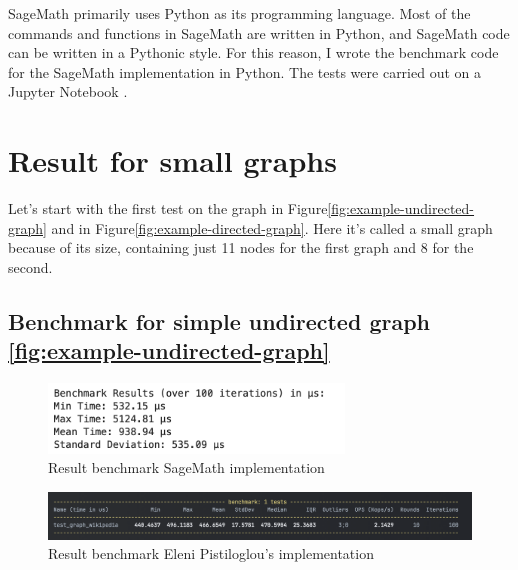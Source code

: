 SageMath primarily uses Python as its programming language.
Most of the commands and functions in SageMath are written in Python, and SageMath code can be written in a Pythonic style.
For this reason, I wrote the benchmark code for the SageMath implementation in Python.
The tests were carried out on a Jupyter Notebook \cite{jupyternotebook}.


\section{Result for small graphs}\label{sec:result-for-small-graphs}

Let's start with the first test on the graph in Figure\ref{fig:example-undirected-graph} and in Figure\ref{fig:example-directed-graph}.
Here it's called a small graph because of its size, containing just 11 nodes for the first graph and 8 for the second.

\newpage

\subsection{Benchmark for simple undirected graph \ref{fig:example-undirected-graph}}\label{subsec:benchmark-for-simple-undirected-graph}

\begin{figure}[!h]
    \centering
    \includegraphics[width=0.70\textwidth]{images/benchmark/graph_wikipedia/benchmark_graph_wikipedia_sagemath}
    \caption{Result benchmark SageMath implementation}
    \label{fig:benchmark-graph-wikipedia-sagemath}
\end{figure}

\begin{figure}[!h]
    \centering
    \includegraphics[width=1.10\textwidth]{images/benchmark/graph_wikipedia/benchmark_graph_wikipedia_python}
    \caption{Result benchmark Eleni Pistiloglou's implementation}
    \label{fig:benchmark-graph-wikipedia-python}
\end{figure}

